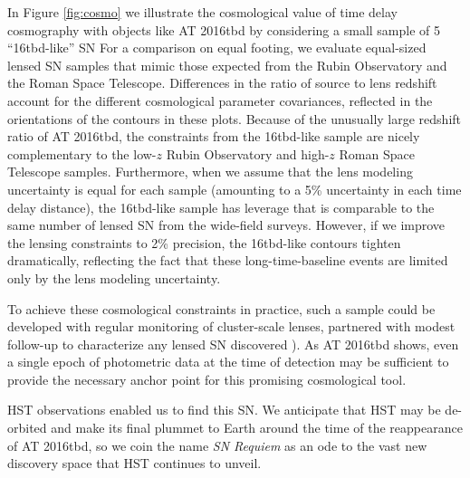 \documentclass[12pt]{article}
\def\TNSname{AT 2016tbd\xspace}
\def\SNABC{AT 2016tbd\xspace}
\def\reqlike{16tbd-like\xspace}
\begin{document}
In Figure \ref{fig:cosmo} we illustrate the cosmological value of time delay cosmography with objects like \SNABC  by considering a small sample of 5 ``\reqlike'' SN 
For a comparison on equal footing, we evaluate equal-sized lensed SN samples 
that mimic those expected from the Rubin Observatory and  the Roman Space Telescope.  Differences in the 
ratio of source to lens redshift account for the different cosmological parameter covariances, reflected in the orientations of the contours in these plots. Because of the unusually large redshift ratio of \SNABC, the constraints 
from the \reqlike sample are nicely complementary to the low-$z$ Rubin Observatory and high-$z$ Roman Space Telescope samples. 
Furthermore, when we assume that the lens modeling uncertainty is equal for each sample (amounting to a 5\% uncertainty in each time delay distance), the \reqlike sample has leverage that is comparable to the same number of lensed SN from the wide-field surveys. However, if we improve  the lensing constraints to 2\% precision, the \reqlike contours tighten dramatically, reflecting the fact that these long-time-baseline events are limited only by the lens modeling uncertainty.

To achieve these cosmological constraints in practice, such a sample could be developed with regular monitoring of cluster-scale lenses, partnered with modest follow-up to characterize any lensed SN discovered
).
As \SNABC shows, even a single epoch of photometric data at the time of detection may be sufficient to provide the necessary anchor point for this promising cosmological tool.  

HST observations enabled us to find this SN.  We anticipate that HST may be de-orbited and make its final plummet to Earth around the time of the reappearance of \TNSname, so we coin the name {\it SN  Requiem} as an ode to the vast new discovery space that HST continues to unveil.


\end{document}
